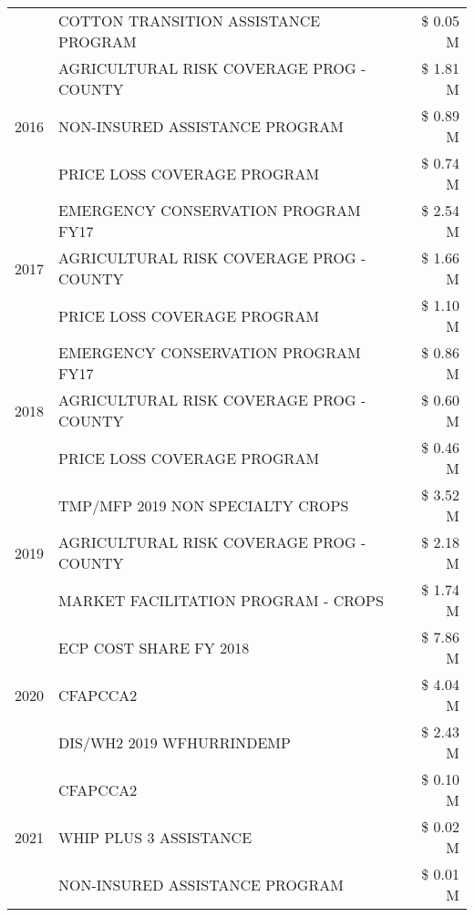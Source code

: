 \begin{tabular}{llr}
 & COTTON TRANSITION ASSISTANCE PROGRAM & \$ 0.05 M \\
\cline{1-3}
\multirow[t]{3}{*}{2016} & AGRICULTURAL RISK COVERAGE PROG - COUNTY & \$ 1.81 M \\
 & NON-INSURED ASSISTANCE PROGRAM & \$ 0.89 M \\
 & PRICE LOSS COVERAGE PROGRAM & \$ 0.74 M \\
\cline{1-3}
\multirow[t]{3}{*}{2017} & EMERGENCY CONSERVATION PROGRAM FY17 & \$ 2.54 M \\
 & AGRICULTURAL RISK COVERAGE PROG - COUNTY & \$ 1.66 M \\
 & PRICE LOSS COVERAGE PROGRAM & \$ 1.10 M \\
\cline{1-3}
\multirow[t]{3}{*}{2018} & EMERGENCY CONSERVATION PROGRAM FY17 & \$ 0.86 M \\
 & AGRICULTURAL RISK COVERAGE PROG - COUNTY & \$ 0.60 M \\
 & PRICE LOSS COVERAGE PROGRAM & \$ 0.46 M \\
\cline{1-3}
\multirow[t]{3}{*}{2019} & TMP/MFP 2019 NON SPECIALTY CROPS & \$ 3.52 M \\
 & AGRICULTURAL RISK COVERAGE PROG - COUNTY & \$ 2.18 M \\
 & MARKET FACILITATION PROGRAM - CROPS & \$ 1.74 M \\
\cline{1-3}
\multirow[t]{3}{*}{2020} & ECP COST SHARE FY 2018 & \$ 7.86 M \\
 & CFAPCCA2 & \$ 4.04 M \\
 & DIS/WH2 2019 WFHURRINDEMP & \$ 2.43 M \\
\cline{1-3}
\multirow[t]{3}{*}{2021} & CFAPCCA2 & \$ 0.10 M \\
 & WHIP PLUS 3 ASSISTANCE & \$ 0.02 M \\
 & NON-INSURED ASSISTANCE PROGRAM & \$ 0.01 M \\
\cline{1-3}
\bottomrule
\end{tabular}

